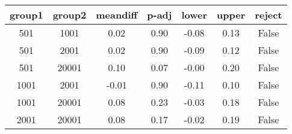 \begin{tabular}{|c|c|c|c|c|c|c|}
\toprule
 group1 &  group2 &  meandiff &  p-adj &  lower &  upper &  reject \\
\midrule
    501 &    1001 &      0.02 &   0.90 &  -0.08 &   0.13 &   False \\
    501 &    2001 &      0.02 &   0.90 &  -0.09 &   0.12 &   False \\
    501 &   20001 &      0.10 &   0.07 &  -0.00 &   0.20 &   False \\
   1001 &    2001 &     -0.01 &   0.90 &  -0.11 &   0.10 &   False \\
   1001 &   20001 &      0.08 &   0.23 &  -0.03 &   0.18 &   False \\
   2001 &   20001 &      0.08 &   0.17 &  -0.02 &   0.19 &   False \\
\bottomrule
\end{tabular}
